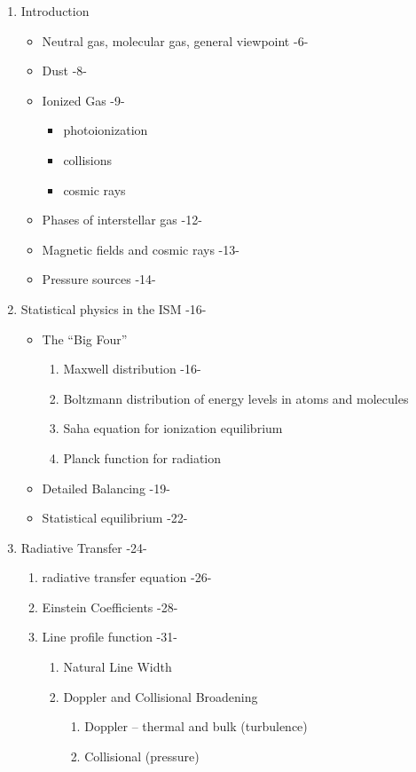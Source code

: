 \documentclass{article}
\begin{document}
\begin{enumerate}[label=\Roman*.]

\item Introduction
\begin{itemize}
  \item Neutral gas, molecular gas, general viewpoint -6-
  \item Dust -8-
  \item Ionized Gas -9-
      \begin{itemize}
          \item photoionization
          \item collisions
          \item cosmic rays
      \end{itemize}
  \item Phases of interstellar gas -12-
  \item Magnetic fields and cosmic rays -13-
  \item Pressure sources -14-
\end{itemize}

\item Statistical physics in the ISM -16-
\begin{itemize}
    \item The ``Big Four''
    \begin{enumerate}[label=\arabic*]
        \item Maxwell distribution -16-
        \item Boltzmann distribution of energy levels in atoms and molecules
        \item Saha equation for ionization equilibrium
        \item Planck function for radiation
    \end{enumerate}
    \item Detailed Balancing -19-
    \item Statistical equilibrium -22-
\end{itemize}


\item Radiative Transfer -24-
\begin{enumerate}%
  \item radiative transfer equation -26-
  \item Einstein Coefficients -28-
  \item Line profile function -31-
  \begin{enumerate}
    \item Natural Line Width
    \item Doppler and Collisional Broadening
    \begin{enumerate}%
      \item Doppler -- thermal and bulk (turbulence)
      \item Collisional (pressure)
    \end{enumerate}
  \end{enumerate}
\end{enumerate}


\end{enumerate}
\end{document}
